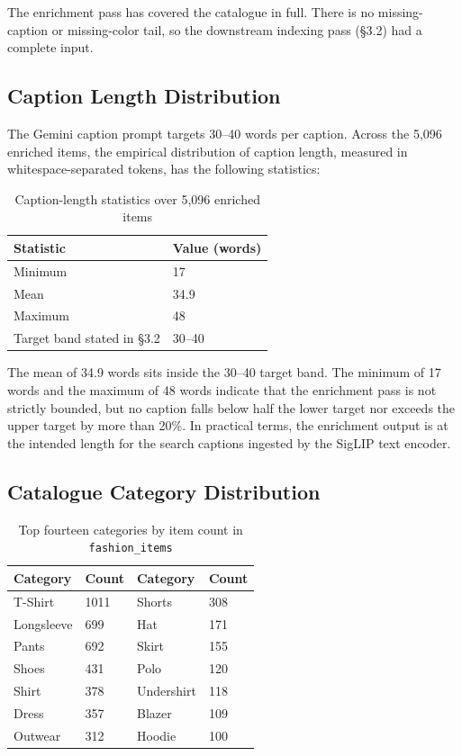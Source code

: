 The enrichment pass has covered the catalogue in full. There is no missing-caption or missing-color tail, so the downstream indexing pass (§3.2) had a complete input.

\subsection{Caption Length Distribution}
\label{subsec:caption_length}

The Gemini caption prompt targets 30--40 words per caption. Across the 5,096 enriched items, the empirical distribution of caption length, measured in whitespace-separated tokens, has the following statistics:

\begin{table}[H]
\centering
\begin{tabular}{p{4.5cm}p{3cm}}
\toprule
\textbf{Statistic} & \textbf{Value (words)}\\
\midrule
Minimum & 17\\
Mean & 34.9\\
Maximum & 48\\
Target band stated in §3.2 & 30--40\\
\bottomrule
\end{tabular}
\caption{Caption-length statistics over 5,096 enriched items}
\label{tab:caption_length}
\end{table}

The mean of 34.9 words sits inside the 30--40 target band. The minimum of 17 words and the maximum of 48 words indicate that the enrichment pass is not strictly bounded, but no caption falls below half the lower target nor exceeds the upper target by more than 20\%. In practical terms, the enrichment output is at the intended length for the search captions ingested by the SigLIP text encoder.

\subsection{Catalogue Category Distribution}
\label{subsec:category_distribution}

\begin{table}[H]
\centering
\begin{tabular}{p{3cm}p{2cm}p{3cm}p{2cm}}
\toprule
\textbf{Category} & \textbf{Count} & \textbf{Category} & \textbf{Count}\\
\midrule
T-Shirt    & 1011 & Shorts     & 308\\
Longsleeve & 699  & Hat        & 171\\
Pants      & 692  & Skirt      & 155\\
Shoes      & 431  & Polo       & 120\\
Shirt      & 378  & Undershirt & 118\\
Dress      & 357  & Blazer     & 109\\
Outwear    & 312  & Hoodie     & 100\\
\bottomrule
\end{tabular}
\caption{Top fourteen categories by item count in \texttt{fashion\_items}}
\label{tab:category_distribution}
\end{table}

